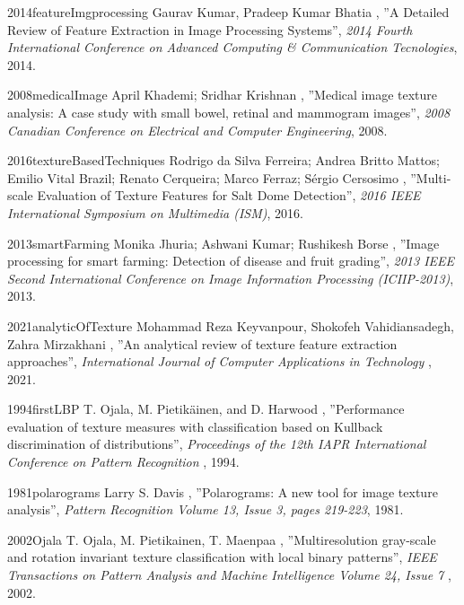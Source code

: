 \documentclass[a4paper,12pt,oneside]{book}%
\begin{document}
\begin{thebibliography}{xx}
	{2014}{featureImgprocessing}
	Gaurav Kumar, Pradeep Kumar Bhatia
	, ''A Detailed Review of Feature Extraction in Image Processing Systems'', {\em 2014 Fourth International Conference on Advanced Computing \& Communication Tecnologies}, 2014.
	
	{2008}{medicalImage}
	April Khademi; Sridhar Krishnan
	, ''Medical image texture analysis: A case study with small bowel, retinal and mammogram images'', {\em 2008 Canadian Conference on Electrical and Computer Engineering}, 2008.
	
	{2016}{textureBasedTechniques}
	Rodrigo da Silva Ferreira; Andrea Britto Mattos; Emilio Vital Brazil; Renato Cerqueira; Marco Ferraz; Sérgio Cersosimo
	, ''Multi-scale Evaluation of Texture Features for Salt Dome Detection'', {\em 2016 IEEE International Symposium on Multimedia (ISM)}, 2016.
	
	{2013}{smartFarming}
	Monika Jhuria; Ashwani Kumar; Rushikesh Borse
	, ''Image processing for smart farming: Detection of disease and fruit grading'', {\em 2013 IEEE Second International Conference on Image Information Processing (ICIIP-2013)}, 2013.
	
	
	{2021}{analyticOfTexture}
	Mohammad Reza Keyvanpour, Shokofeh Vahidiansadegh, Zahra Mirzakhani
	, ''An analytical review of texture feature extraction approaches'', {\em International Journal of Computer Applications in Technology }, 2021.
	
	{1994}{firstLBP}
	T. Ojala, M. Pietikäinen, and D. Harwood 
	, ''Performance evaluation of texture measures with classification based on Kullback discrimination of distributions'', {\em  Proceedings of the 12th IAPR International Conference on Pattern Recognition }, 1994.
	
	{1981}{polarograms}
	Larry S. Davis
	, ''Polarograms: A new tool for image texture analysis'', {\em  Pattern Recognition Volume 13, Issue 3, pages 219-223}, 1981.
	
	{2002}{Ojala}
	T. Ojala, M. Pietikainen, T. Maenpaa
	, ''Multiresolution gray-scale and rotation invariant texture classification with local binary patterns'', {\em  IEEE Transactions on Pattern Analysis and Machine Intelligence Volume 24, Issue 7 }, 2002.
	

\end{thebibliography}
\end{document}
